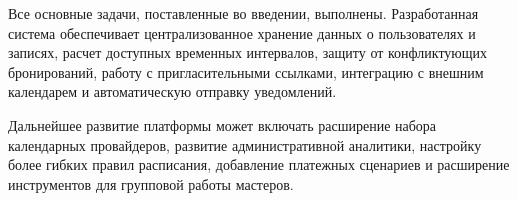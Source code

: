 Все основные задачи, поставленные во введении, выполнены. Разработанная система обеспечивает централизованное хранение данных о пользователях и записях, расчет доступных временных интервалов, защиту от конфликтующих бронирований, работу с пригласительными ссылками, интеграцию с внешним календарем и автоматическую отправку уведомлений.

Дальнейшее развитие платформы может включать расширение набора календарных провайдеров, развитие административной аналитики, настройку более гибких правил расписания, добавление платежных сценариев и расширение инструментов для групповой работы мастеров.
